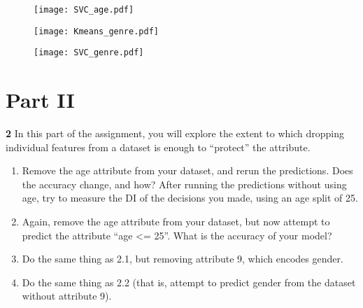 \documentclass[14pt]{article}
\begin{document}
\begin{figure}[H]
\centering
\texttt{[image: SVC\_age.pdf]}
\end{figure}

\begin{figure}[H]
\centering
\texttt{[image: Kmeans\_genre.pdf]}
\end{figure}


\begin{figure}[H]
\centering
\texttt{[image: SVC\_genre.pdf]}
\end{figure}

\section*{Part II}

\begin{mdframed}
\textbf{2} In this part of the assignment, you will explore the extent to which
dropping individual features from a dataset is enough to “protect” the
attribute.

\begin{enumerate}
\item   Remove the age attribute from your dataset, and rerun the
predictions. Does the accuracy change, and how? After running the
predictions without using age, try to measure the DI of the decisions
you made, using an age split of 25.

\item    Again, remove the age attribute from your dataset, but now attempt
to predict the attribute “age <= 25”. What is the accuracy of your
model?

\item  Do the same thing as 2.1, but removing attribute 9, which encodes
gender.

\item  Do the same thing as 2.2 (that is, attempt to predict gender from
the dataset without attribute 9).

\end{enumerate}
\end{mdframed}
\end{document}

